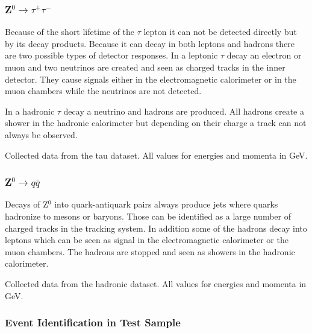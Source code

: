 \documentclass[11pt, a4paper]{article}
\numberwithin{equation}{section}
\begin{document}
\subsubsection{Z$^0\rightarrow \tau^+\tau^-$}

Because of the short lifetime of the $\tau$ lepton it can not be detected directly but by its decay products.
Because it can decay in both leptons and hadrons there are two possible types of detector responses.
In a leptonic $\tau$ decay an electron or muon and two neutrinos are created and seen as charged tracks in the inner detector.
They cause signals either in the electromagnetic calorimeter or in the muon chambers while the neutrinos are not detected.

In a hadronic $\tau$ decay a neutrino and hadrons are produced.
All hadrons create a shower in the hadronic calorimeter but depending on their charge a track can not always be observed.
\begin{table}[h]
	\centering
	\resizebox{\textwidth}{!}{
		
	}
	\caption{Collected data from the tau dataset. All values for energies and momenta in \si{GeV}.}
\end{table}

\subsubsection{Z$^0\rightarrow q\bar{q}$}

Decays of Z$^0$ into quark-antiquark pairs always produce jets where quarks hadronize to mesons or baryons.
Those can be identified as a large number of charged tracks in the tracking system.
In addition some of the hadrons decay into leptons which can be seen as signal in the electromagnetic calorimeter or the muon chambers.
The hadrons are stopped and seen as showers in the hadronic calorimeter.
\begin{table}[h]
	\centering
	\resizebox{\textwidth}{!}{
		
	}
	\caption{Collected data from the hadronic dataset. All values for energies and momenta in \si{GeV}.}
\end{table}

\subsubsection{Event Identification in Test Sample}
\end{document}
